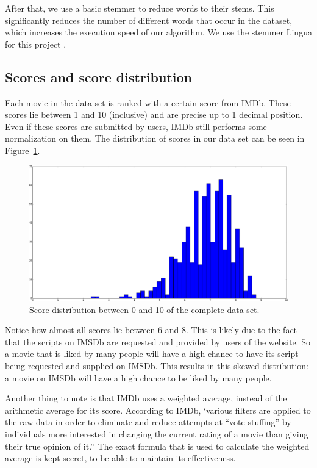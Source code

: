 \documentclass{article} %
\begin{document}
After that, we use a basic stemmer to reduce words to their stems.
This significantly reduces the number of different words that occur in the dataset, which increases the execution speed of our algorithm. 
We use the stemmer Lingua for this project \cite{lingua}.

\subsection{Scores and score distribution}
Each movie in the data set is ranked with a certain score from IMDb.
These scores lie between 1 and 10 (inclusive) and are precise up to 1 decimal position.
Even if these scores are submitted by users, IMDb still performs some normalization on them.
The distribution of scores in our data set can be seen in Figure~\ref{fig:scorehist}.

\begin{figure}[ht!]
  \centering
  \includegraphics[width=\textwidth]{scores_histogram.png}
  \caption{Score distribution between 0 and 10 of the complete data set.}
  \label{fig:scorehist}
\end{figure}

Notice how almost all scores lie between 6 and 8.
This is likely due to the fact that the scripts on IMSDb are requested and provided by users of the website. 
So a movie that is liked by many people will have a high chance to have its script being requested and supplied on IMSDb.
This results in this skewed distribution: a movie on IMSDb will have a high chance to be liked by many people.

Another thing to note is that IMDb uses a weighted average, instead of the arithmetic average for its score.
According to IMDb, `various filters are applied to the raw data in order to eliminate and reduce attempts at ``vote stuffing'' by individuals more interested in changing the current rating of a movie than giving their true opinion of it.''
The exact formula that is used to calculate the weighted average is kept secret, to be able to maintain its effectiveness. 
\end{document}
